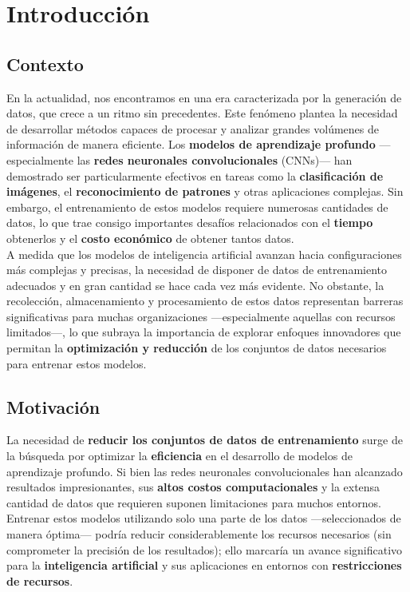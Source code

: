 \chapter{Introducción}\label{ch:introduccion}

\section{Contexto}\label{sec:contexto}
En la actualidad, nos encontramos en una era caracterizada por la generación de datos, que crece a un ritmo sin
precedentes.
Este fenómeno plantea la necesidad de desarrollar métodos capaces de procesar y analizar grandes volúmenes de
información de manera eficiente.
Los \textbf{modelos de aprendizaje profundo} —especialmente las \textbf{redes neuronales convolucionales} (CNNs)— han
demostrado ser particularmente efectivos en tareas como la \textbf{clasificación de imágenes}, el
\textbf{reconocimiento de patrones} y otras aplicaciones complejas.
Sin embargo, el entrenamiento de estos modelos requiere numerosas cantidades de datos, lo que trae consigo importantes
desafíos relacionados con el \textbf{tiempo} obtenerlos y el \textbf{costo económico} de obtener tantos datos. \\[6pt]

A medida que los modelos de inteligencia artificial avanzan hacia configuraciones más complejas y precisas, la
necesidad de disponer de datos de entrenamiento adecuados y en gran cantidad se hace cada vez más evidente.
No obstante, la recolección, almacenamiento y procesamiento de estos datos representan barreras significativas para
muchas organizaciones —especialmente aquellas con recursos limitados—, lo que subraya la importancia de explorar
enfoques innovadores que permitan la \textbf{optimización y reducción} de los conjuntos de datos necesarios para
entrenar estos modelos. \\[6pt]

\section{Motivación}\label{sec:motivacion}
La necesidad de \textbf{reducir los conjuntos de datos de entrenamiento} surge de la búsqueda por optimizar la
\textbf{eficiencia} en el desarrollo de modelos de aprendizaje profundo.
Si bien las redes neuronales convolucionales han alcanzado resultados impresionantes, sus
\textbf{altos costos computacionales} y la extensa cantidad de datos que requieren suponen limitaciones para muchos
entornos.
Entrenar estos modelos utilizando solo una parte de los datos —seleccionados de manera óptima— podría reducir
considerablemente los recursos necesarios (sin comprometer la precisión de los resultados); ello marcaría un avance
significativo para la \textbf{inteligencia artificial} y sus aplicaciones en entornos con
\textbf{restricciones de recursos}. \\[6pt]

